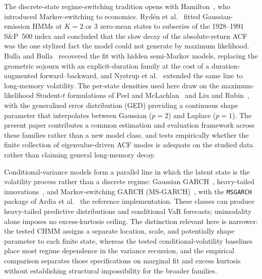 The discrete-state regime-switching tradition opens with Hamilton~\cite{hamilton1989new}, who introduced Markov-switching to economics. Ryd\'{e}n et al.~\cite{ryden1998stylized} fitted Gaussian-emission HMMs at $K = 2$ or $3$ zero-mean states to subseries of the 1928--1991 S\&P~500 index and concluded that the slow decay of the absolute-return ACF was the one stylized fact the model could not generate by maximum likelihood. Bulla and Bulla~\cite{bulla2006stylized} recovered the fit with hidden semi-Markov models, replacing the geometric sojourn with an explicit-duration family at the cost of a duration-augmented forward--backward, and Nystrup et al.~\cite{nystrup2017long} extended the same line to long-memory volatility. The per-state densities used here draw on the maximum-likelihood Student-$t$ formulations of Peel and McLachlan~\cite{peel2000robust} and Liu and Rubin~\cite{liu1995ml}, with the generalized error distribution (GED) providing a continuous shape parameter that interpolates between Gaussian ($p = 2$) and Laplace ($p = 1$). The present paper contributes a common estimation and evaluation framework across these families rather than a new model class, and tests empirically whether the finite collection of eigenvalue-driven ACF modes is adequate on the studied data rather than claiming general long-memory decay.

Conditional-variance models form a parallel line in which the latent state is the volatility process rather than a discrete regime: Gaussian GARCH~\cite{engle1982autoregressive, bollerslev1986generalized}, heavy-tailed innovations~\cite{bollerslev1987conditionally}, and Markov-switching GARCH (MS-GARCH)~\cite{haas2004new}, with the \texttt{MSGARCH} package of Ardia et al.~\cite{ardia2019msgarch} the reference implementation. These classes can produce heavy-tailed predictive distributions and conditional VaR forecasts; unimodality alone imposes no excess-kurtosis ceiling. The distinction relevant here is narrower: the tested CHMM assigns a separate location, scale, and potentially shape parameter to each finite state, whereas the tested conditional-volatility baselines place most regime dependence in the variance recursion, and the empirical comparison separates those specifications on marginal fit and excess kurtosis without establishing structural impossibility for the broader families.


